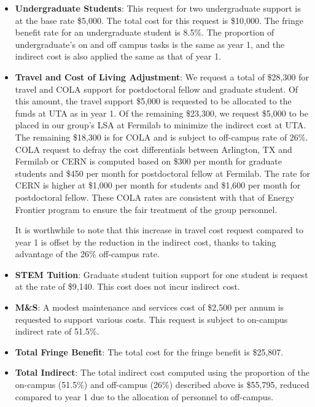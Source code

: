 \begin{enumerate}
\begin{itemize}[noitemsep,nolistsep]
\item {{\bf Undergraduate Students}: This request for two undergraduate support is at the base rate \$5,000.  The total cost for this request is \$10,000.  The fringe benefit rate for an undergraduate student is 8.5\%.  The proportion of undergraduate’s on and off campus tasks is the same as year 1, and the indirect cost is also applied the same as that of year 1.}

\item{{\bf Travel and Cost of Living Adjustment}: We request a total of \$28,300 for travel and COLA support for postdoctoral fellow and graduate student.   Of this amount, the travel support \$5,000 is requested to be allocated to the funds at UTA as in year 1.  Of the remaining \$23,300, we request \$5,000 to be placed in our group’s LSA at Fermilab to minimize the indirect cost at UTA.   The remaining \$18,300 is for COLA and is subject to off-campus rate of 26\%.  COLA request to defray the cost differentials between Arlington, TX and Fermilab or CERN is computed based on \$300 per month for graduate students and \$450 per month for postdoctoral fellow at Fermilab.  The rate for CERN is higher at \$1,000 per month for students and \$1,600 per month for postdoctoral fellow.  These COLA rates are consistent with that of Energy Frontier program to ensure the fair treatment of the group personnel.  

It is worthwhile to note that this increase in travel cost request compared to year 1 is offset by the reduction in the indirect cost, thanks to taking advantage of the 26\% off-campus rate.}

\item {{\bf STEM Tuition}: Graduate student tuition support for one student is request at the rate of \$9,140.  This cost does not incur indirect cost.}

\item {{\bf M\&S}: A modest maintenance and services cost of \$2,500 per annum is requested to support various costs.   This request is subject to on-campus indirect rate of 51.5\%.}

\item {{\bf Total Fringe Benefit}: The total cost for the fringe benefit is \$25,807.}

\item {{\bf Total Indirect}: The total indirect cost computed using the proportion of the on-campus (51.5\%) and off-campus (26\%) described above is \$55,795, reduced compared to year 1 due to the allocation of personnel to off-campus.}


\end{itemize}
\end{enumerate}
